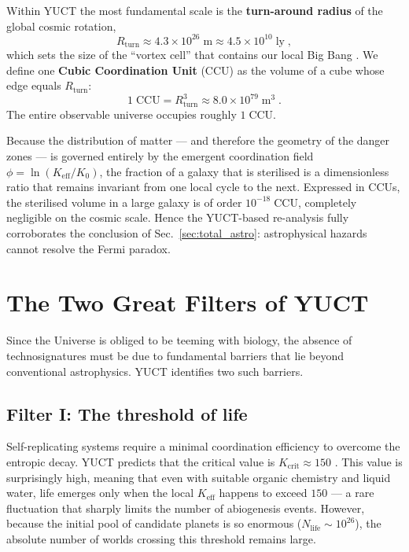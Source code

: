 \documentclass[12pt,a4paper]{article}
\newcommand{\Keff}{K_{\mathrm{eff}}}
\newcommand{\CCU}{\text{CCU}}  %
\begin{document}
	Within YUCT the most fundamental scale is the \textbf{turn-around
		radius} of the global cosmic rotation,
	\begin{equation}
		R_{\mathrm{turn}} \approx 4.3\times 10^{26}\;\mathrm{m}
		\approx 4.5\times 10^{10}\;\mathrm{ly}\;,
	\end{equation}
	which sets the size of the ``vortex cell'' that contains our local Big
	Bang \citep{AppOmega}.  We define one \textbf{Cubic Coordination Unit} (CCU) as
	the volume of a cube whose edge equals $R_{\mathrm{turn}}$:
	\begin{equation}
		1\;\CCU = R_{\mathrm{turn}}^{3} \approx 8.0\times 10^{79}\;\mathrm{m}^{3}\; .
	\end{equation}
	The entire observable universe occupies roughly $1\;\CCU$.
	
	Because the distribution of matter --- and therefore the geometry of the
	danger zones --- is governed entirely by the emergent coordination field
	$\phi = \ln(\Keff/K_{0})$, the fraction of a galaxy that is sterilised
	is a dimensionless ratio that remains invariant from one local cycle to
	the next.  Expressed in CCUs, the sterilised volume in a large galaxy
	is of order $10^{-18}\;\CCU$, completely negligible on the cosmic
	scale.  Hence the YUCT-based re-analysis fully corroborates the
	conclusion of Sec.~\ref{sec:total_astro}: astrophysical hazards cannot
	resolve the Fermi paradox.
	
	\section{The Two Great Filters of YUCT}
	\label{sec:yuct_filters}
	Since the Universe is obliged to be teeming with biology, the absence
	of technosignatures must be due to fundamental barriers that lie
	beyond conventional astrophysics.  YUCT identifies two such barriers.
	
	\subsection{Filter I: The threshold of life}
	\label{sec:filter1}
	Self-replicating systems require a minimal coordination efficiency to
	overcome the entropic decay.  YUCT predicts that the critical value is
	$K_{\mathrm{crit}}\approx 150$ \citep{AppT}.  This value is
	surprisingly high, meaning that even with suitable organic chemistry
	and liquid water, life emerges only when the local $K_{\mathrm{eff}}$
	happens to exceed $150$ --- a rare fluctuation that sharply limits the
	number of abiogenesis events.  However, because the initial pool of
	candidate planets is so enormous ($N_{\mathrm{life}}\sim 10^{26}$),
	the absolute number of worlds crossing this threshold remains large.
	
\end{document}

